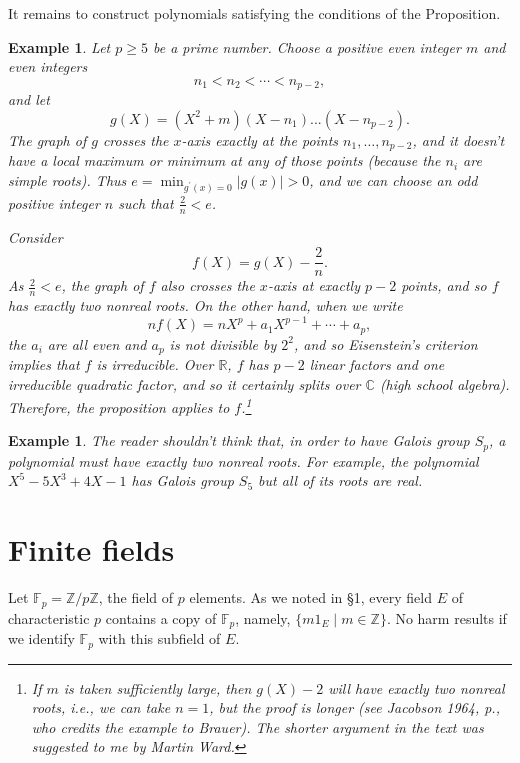 \documentclass[a4paper,11pt,final,openany]{memoir}
\newtheorem{example}[X]{Example}
\theoremstyle{nonumberplain}
\begin{document}
It remains to construct polynomials satisfying the conditions of the Proposition.

\begin{example}
\label{cg14}Let $p$$\geq5$ be a prime number. Choose a positive even integer
$m$ and even integers
\[
n_{1}<n_{2}<\cdots<n_{p-2},
\]
and let
\[
g(X)=(X^{2}+m)(X-n_{1})...(X-n_{p-2}).
\]
The graph of $g$ crosses the $x$-axis exactly at the points $n_{1}%
,\ldots,n_{p-2}$, and it doesn't have a local maximum or minimum at any of
those points (because the $n_{i}$ are simple roots). Thus $e=\min_{g^{\prime
}(x)=0}|g(x)|>0$, and we can choose an odd positive integer $n$ such that
$\frac{2}{n}<e$.

Consider%
\[
f(X)=g(X)-\frac{2}{n}\text{.}%
\]
As $\frac{2}{n}<e$, the graph of $f$ also crosses the $x$-axis at exactly
$p-2$ points, and so $f$ has exactly two nonreal roots. On the other hand,
when we write%
\[
nf(X)=nX^{p}+a_{1}X^{p-1}+\cdots+a_{p},
\]
the $a_{i}$ are all even and $a_{p}$ is not divisible by $2^{2}$, and so
Eisenstein's criterion implies that $f$ is irreducible. Over $\mathbb{R}{}$,
$f$ has $p-2$ linear factors and one irreducible quadratic factor, and so it
certainly splits over $\mathbb{C}{}$ (high school algebra). Therefore, the
proposition applies to $f$.\footnote{If $m$ is taken sufficiently large, then
$g(X)-2$ will have exactly two nonreal roots, i.e., we can take $n=1$, but the
proof is longer (see Jacobson 1964, p., who credits the example
to Brauer). The shorter argument in the text was suggested to me by Martin
Ward.}
\end{example}

\begin{example}
\label{cg14a}The reader shouldn't think that, in order to have Galois group
$S_{p}$, a polynomial must have exactly two nonreal roots. For example, the
polynomial $X^{5}-5X^{3}+4X-1$ has Galois group $S_{5}$ but all of its roots
are real.
\end{example}

\section{Finite fields}

Let $\mathbb{F}_{p}=\mathbb{Z}/p\mathbb{Z}$, the field of $p$ elements. As we
noted in \S 1, every field $E$ of characteristic $p$ contains a copy of
$\mathbb{F}_{p}$, namely, $\{m1_{E}\mid m\in\mathbb{Z}\}$. No harm results if
we identify $\mathbb{F}_{p}$ with this subfield of $E$.
\end{document}

